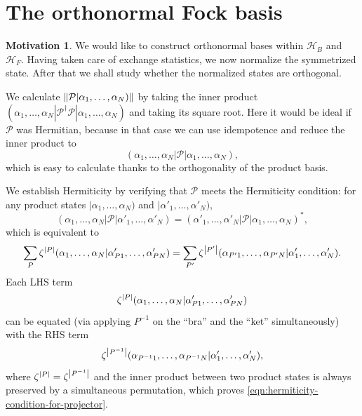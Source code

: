 \documentclass{article}
\theoremstyle{definition}
\newtheorem{mot}{Motivation}[section]
\numberwithin{equation}{section}
\begin{document}
\section{The orthonormal Fock basis}
\begin{mot}
    We would like to construct orthonormal bases within 
    $\mathcal{H}_{B}$ and $\mathcal{H}_{F}$. 
    Having taken care of exchange statistics, we now 
    normalize the symmetrized state. After that 
    we shall study whether the normalized states are orthogonal. 
\end{mot}

    We calculate $\norm{\mathcal{P}|\alpha_1, \ldots ,\alpha_{N})}$ 
    by taking the inner product 
    $(\alpha_1, \ldots ,\alpha_{N}|\mathcal{P}^{\dagger}\mathcal{P}|\alpha_1, \ldots ,\alpha_{N})$ and taking its square root. 
    Here it would be ideal if $\mathcal{P}$ was 
    Hermitian, because in that case we can use 
    idempotence and reduce the inner product to 
    \[
    (\alpha_1, \ldots ,\alpha_{N}|\mathcal{P}|\alpha_1, \ldots ,\alpha_{N}),
    \]
    which is easy to calculate thanks to the 
    orthogonality of the product basis.
    
    We establish Hermiticity by verifying that $\mathcal{P}$ meets 
    the Hermiticity condition: for any product states 
    $|\alpha_{1}, \ldots ,\alpha_{N})$ and 
    $|\alpha'_{1}, \ldots ,\alpha'_{N})$,
    \begin{equation}
        (\alpha_1, \ldots ,\alpha_{N}|\mathcal{P}|
        \alpha'_{1}, \ldots ,\alpha'_{N})
        =
        (\alpha'_1, \ldots ,\alpha'_{N}|\mathcal{P}|
        \alpha_{1}, \ldots ,\alpha_{N})^{*},
    \label{eqn:hermiticity-condition-for-projector}
    \end{equation}
    which is equivalent to 
    \[
        \sum_{P}\zeta^{\abs{P}}
        (\alpha_1, \ldots ,\alpha_{N}|
        \alpha'_{P1}, \ldots ,\alpha'_{PN})
        =
        \sum_{P'}\zeta^{\abs{P'}}
        (\alpha_{P'1}, \ldots ,\alpha_{P'N}|
        \alpha'_{1}, \ldots ,\alpha'_{N}).
    \]
    Each LHS term 
    \[
        \zeta^{\abs{P}}
    (\alpha_1, \ldots ,\alpha_{N}|
    \alpha'_{P1}, \ldots ,\alpha'_{PN})
    \]
    can be equated (via applying $P ^{-1}$ on 
    the ``bra'' and the ``ket'' simultaneously) with the RHS term 
    \[
        \zeta^{\abs{P ^{-1}}}
    (\alpha_{P ^{-1} 1}, \ldots ,\alpha_{P ^{-1} N}|
    \alpha'_{1}, \ldots ,\alpha'_{N}),
    \]
    where $\zeta^{\abs{P}}=\zeta^{\abs{P^{-1}}}$ and 
    the inner product between 
    two product states is always preserved 
    by a simultaneous permutation, 
    which proves \cref{eqn:hermiticity-condition-for-projector}.
\end{document}
